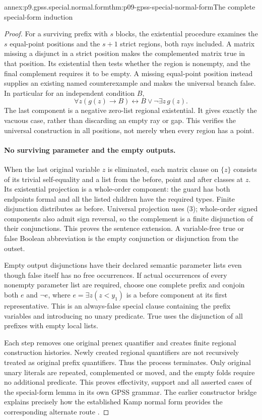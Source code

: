 \begin{annexitem}{annex:p9.gpss.special.normal.form}{thm:p09-gpss-special-normal-form}{The complete special-form induction}
\begin{proof}
For a surviving prefix with \(s\) blocks, the existential
procedure examines the \(s\) equal-point positions and
the \(s+1\) strict regions, both rays included. A matrix
missing a disjunct in a strict position makes the complemented
matrix true in that position. Its existential then tests
whether the region is nonempty, and the final complement
requires it to be empty. A missing equal-point position
instead supplies an existing named counterexample and makes
the universal branch false. In particular for an independent
condition \(B\),
\[
 \forall z(g(z)\to B)
       \longleftrightarrow B\lor\neg\exists z\,g(z).
\]
The last component is a negative zero-list regional existential.
It gives exactly the vacuous case, rather than discarding an
empty ray or gap. This verifies the universal construction
in all positions, not merely when every region has a point.

\paragraph{No surviving parameter and the empty outputs.}
When the last original variable \(z\) is eliminated,
each matrix clause on \(\{z\}\) consists of its trivial
self-equality and a list from the before, point and after
classes at \(z\). Its existential projection is a
whole-order component: the guard has both endpoints formal
and all the listed children have the required types.
Finite disjunction distributes as before. Universal
projection uses (3); whole-order signed components also
admit sign reversal, so the complement is a finite
disjunction of their conjunctions. This proves the sentence
extension. A variable-free true or false Boolean abbreviation
is the empty conjunction or disjunction from the outset.

Empty output disjunctions have their declared semantic
parameter lists even though false itself has no free
occurrences. If actual occurrences of every nonempty
parameter list are required, choose one complete prefix
and conjoin both \(e\) and \(\neg e\), where
\(e=\exists z(z<y_1)\) is a before component at its
first representative. This is an always-false special
clause containing the prefix variables and introducing
no unary predicate. True uses the disjunction of all
prefixes with empty local lists.

Each step removes one original prenex quantifier and
creates finite regional construction histories. Newly
created regional quantifiers are not recursively treated
as original prefix quantifiers. Thus the process terminates.
Only original unary literals are repeated, complemented
or moved, and the empty folds require no additional
predicate. This proves effectivity, support and all
asserted cases of the special-form lemma in its own
GPSS grammar. The earlier constructor bridge explains
precisely how the established Kamp normal form provides
the corresponding alternate route
\cite[Lemma~1, p.~170]{GabbayPnueliShelahStavi1980}.
\end{proof}
\end{annexitem}

